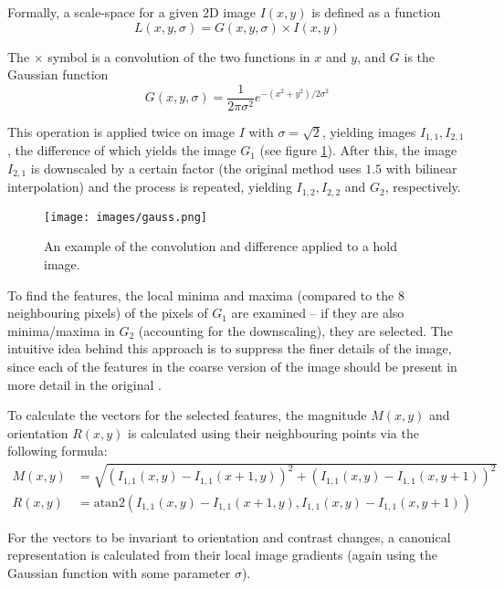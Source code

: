 Formally, a scale-space for a given 2D image $I(x, y)$ is defined as a function
\begin{equation} L(x, y, \sigma) = G(x, y, \sigma) \times I(x, y) \end{equation}

The $\times$ symbol is a convolution of the two functions in $x$ and $y$, and $G$ is the Gaussian function
\begin{equation}G(x, y, \sigma) = \frac{1}{2\pi \sigma^2} e^{-(x^2 + y^2) / 2\sigma^2}\end{equation}

This operation is applied twice on image $I$ with $\sigma = \sqrt{2}$, yielding images $I_{1,1}, I_{2,1}$, the difference of which yields the image $G_1$ (see figure \ref{fig:gaussexample}).
After this, the image $I_{2,1}$ is downscaled by a certain factor (the original method uses $1.5$ with bilinear interpolation) and the process is repeated, yielding $I_{1,2}, I_{2,2}$ and $G_2$, respectively.


\begin{figure}
	\centering
	\texttt{[image: images/gauss.png]}
	\caption{An example of the convolution and difference applied to a hold image.}
	\label{fig:gaussexample}
\end{figure}

To find the features, the local minima and maxima (compared to the 8 neighbouring pixels) of the pixels of $G_1$ are examined -- if they are also minima/maxima in $G_2$ (accounting for the downscaling), they are selected.
The intuitive idea behind this approach is to suppress the finer details of the image, since each of the features in the coarse version of the image should be present in more detail in the original \cite{scalespace}.

To calculate the vectors for the selected features, the magnitude $M(x,y)$ and orientation $R(x,y)$ is calculated using their neighbouring points via the following formula:
\begin{align}
	M(x,y) &= \sqrt{\left(I_{1,1}(x, y) - I_{1,1}(x + 1, y)\right)^2 + \left(I_{1,1}(x,y) - I_{1,1}(x, y + 1)\right)^2} \\[0.7em]
	R(x,y) &= \mathrm{atan2} \left(I_{1,1}(x, y) - I_{1,1}(x + 1, y), I_{1,1}(x,y) - I_{1,1}(x, y + 1)\right)
\end{align}

For the vectors to be invariant to orientation and contrast changes, a canonical representation is calculated from their local image gradients (again using the Gaussian function with some parameter $\sigma$).

